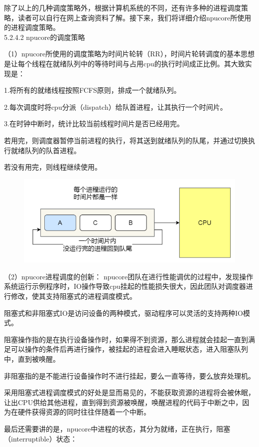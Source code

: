 除了以上的几种调度策略外，根据计算机系统的不同，还有许多种的进程调度策略，读者可以自行在网上查询资料了解。接下来，我们将详细介绍npucore所使用的进程调度策略。
\\[10pt]
5.2.4.2 npucore的调度策略

（1）npucore所使用的调度策略为时间片轮转（RR），时间片轮转调度的基本思想是让每个线程在就绪队列中的等待时间与占用cpu的执行时间成正比例。其大致实现是：

\quad 1.将所有的就绪线程按照FCFS原则，排成一个就绪队列。

\quad 2.每次调度时将cpu分派（dispatch）给队首进程，让其执行一个时间片。

\quad 3.在时钟中断时，统计比较当前线程时间片是否已经用完。

\textbullet 若用完，则调度器暂停当前进程的执行，将其送到就绪队列的队尾，并通过切换执行就绪队列的队首进程。

\textbullet 若没有用完，则线程继续使用。
\begin{figure}
    \centering
    \includegraphics{figures/05-02-04时间片轮转.png}
\end{figure}
（2）npucore进程调度的创新：
npucore团队在进行性能调优的过程中，发现操作系统运行示例程序时，IO操作导致cpu挂起的性能损失很大，因此团队对调度器进行修改，使其支持阻塞式的进程调度模式。

阻塞式和非阻塞式IO是访问设备的两种模式，驱动程序可以灵活的支持两种IO模式。

\textbullet 阻塞操作指的是在执行设备操作时，如果得不到资源，那么进程就会挂起一直到满足可以操作的条件后再进行操作，被挂起的进程会进入睡眠状态，进入阻塞队列中，直到被唤醒。

\textbullet 非阻塞指的是不能进行设备操作时不进行挂起，要么一直等待，要么放弃处理机。

采用阻塞式进程调度模式的好处是显而易见的，不能获取资源的进程将会被休眠，让出CPU供给其他进程，直到得到资源被唤醒，唤醒进程的代码于中断之中，因为在硬件获得资源的同时往往伴随着一个中断。

最后还需要讲的是，npucore中进程的状态，其分为就绪，正在执行，阻塞（interruptible）状态：

